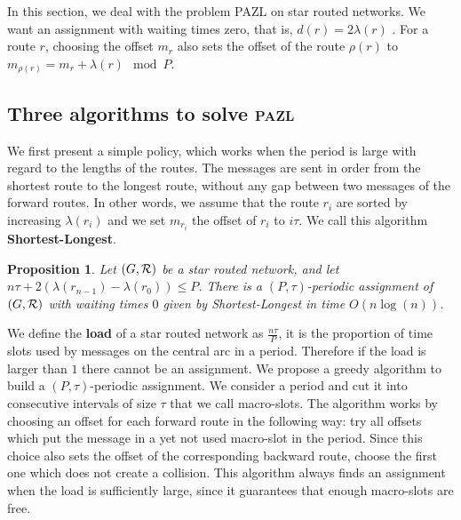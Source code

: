 \documentclass[a4paper,10pt]{IEEEtran}
\newtheorem{proposition}{Proposition}
\newcommand\pazl{\textsc{pazl}\xspace}
\begin{document}
  
     In this section, we deal with the problem PAZL on star routed networks. We want an assignment with waiting times zero, that is, $d(r) = 2\lambda(r)$ . For a route $r$, choosing the offset $m_r$ also sets the offset of the route $\rho(r)$ to $m_{\rho(r)} = m_{r} + \lambda(r) \mod P$.

    \subsection{Three algorithms to solve \pazl}

    We first present a simple policy, which works when the period is large with regard to the lengths of the routes.
    The messages are sent in order from the shortest route to the longest route, without any gap between two messages of the forward routes.
    In other words, we assume that the route $r_i$ are sorted by increasing $\lambda(r_i)$ and we set $m_{r_i}$ the offset of $r_i$ to $i\tau$. We call this algorithm {\bf Shortest-Longest}.
    
      \begin{proposition} Let $(G, {\cal R})$ be a star routed network, and let $n\tau + 2(\lambda(r_{n-1}) - \lambda(r_{0})) \leq P$. There is a $(P,\tau)$-periodic assignment of $(G, {\cal R})$ with waiting times $0$ given by Shortest-Longest in time $O(n\log(n))$.\label{prop:SL}
      \end{proposition}

      

      We define the \textbf{load} of a star routed network as $\frac{n\tau}{P}$, it is the proportion of time slots used by messages on the central arc in a period. Therefore if the load is larger than $1$ there cannot be an assignment. We propose a greedy algorithm to build a $(P,\tau)$-periodic assignment. We consider a period and cut it into consecutive intervals of size $\tau$ that we call macro-slots. The algorithm works by choosing an offset for each forward route in the following way: try all offsets which put the message in a yet not used macro-slot in the period. Since this choice also sets the offset of the corresponding backward route, choose the first one which does not create a collision. This algorithm always finds an assignment when the load is sufficiently large, since it guarantees that enough macro-slots are free.
      
\end{document}

